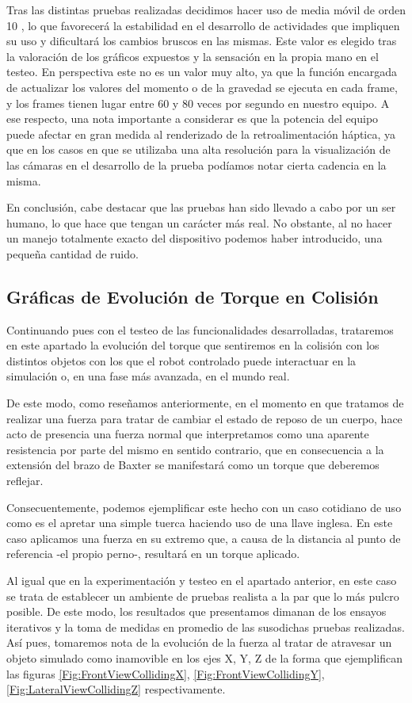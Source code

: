Tras las distintas pruebas realizadas decidimos hacer uso de media móvil de orden 10 \cite{80}, lo que favorecerá la estabilidad en el desarrollo de actividades que impliquen su uso y dificultará los cambios bruscos en las mismas. Este valor es elegido tras la valoración de los gráficos expuestos y la sensación en la propia mano en el testeo. En perspectiva este no es un valor muy alto, ya que la función encargada de actualizar los valores del momento o de la gravedad se ejecuta en cada frame, y los frames tienen lugar entre 60 y 80 veces por segundo en nuestro equipo. A ese respecto, una nota importante a considerar es que la potencia del equipo puede afectar en gran medida al renderizado de la retroalimentación háptica, ya que en los casos en que se utilizaba una alta resolución para la visualización de las cámaras en el desarrollo de la prueba podíamos notar cierta cadencia en la misma.

En conclusión, cabe destacar que las pruebas han sido llevado a cabo por un ser humano, lo que hace que tengan un carácter más real. No obstante, al no hacer un manejo totalmente exacto del dispositivo podemos haber introducido, una pequeña cantidad de ruido.

\subsection{Gráficas de Evolución de Torque en Colisión}
Continuando pues con el testeo de las funcionalidades desarrolladas, trataremos en este apartado la evolución del torque que sentiremos en la colisión con los distintos objetos con los que el robot controlado puede interactuar en la simulación o, en una fase más avanzada, en el mundo real.

De este modo, como reseñamos anteriormente, en el momento en que tratamos de realizar una fuerza para tratar de cambiar el estado de reposo de un cuerpo, hace acto de presencia una fuerza normal que interpretamos como una aparente resistencia por parte del mismo en sentido contrario, que en consecuencia a la extensión del brazo de Baxter se manifestará como un torque que deberemos reflejar. 

Consecuentemente, podemos ejemplificar este hecho con un caso cotidiano de uso como es el apretar una simple tuerca haciendo uso de una llave inglesa. En este caso aplicamos una fuerza en su extremo que, a causa de la distancia al punto de referencia -el propio perno-, resultará en un torque aplicado. 

Al igual que en la experimentación y testeo en el apartado anterior, en este caso se trata de establecer un ambiente de pruebas realista a la par que lo más pulcro posible. De este modo, los resultados que presentamos dimanan de los ensayos iterativos y la toma de medidas en promedio de las susodichas pruebas realizadas. Así pues, tomaremos nota de la evolución de la fuerza al tratar de atravesar un objeto simulado como inamovible en los ejes X, Y, Z de la forma que ejemplifican las figuras \ref{Fig:FrontViewCollidingX},  \ref{Fig:FrontViewCollidingY},  \ref{Fig:LateralViewCollidingZ} respectivamente.

